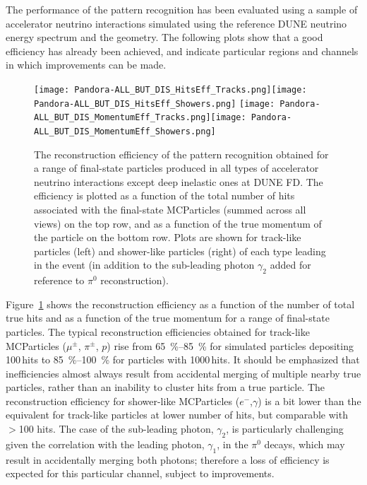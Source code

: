 The performance of the  pattern recognition has been evaluated using a sample of accelerator neutrino interactions simulated using the reference DUNE neutrino energy spectrum and the \nominalmodsize {} geometry. The following plots show that a good efficiency has already been achieved, and indicate particular regions and channels in which improvements can be made. 

\begin{figure}[!ht]
\centering
\texttt{[image: Pandora-ALL\_BUT\_DIS\_HitsEff\_Tracks.png]}\texttt{[image: Pandora-ALL\_BUT\_DIS\_HitsEff\_Showers.png]}
\texttt{[image: Pandora-ALL\_BUT\_DIS\_MomentumEff\_Tracks.png]}\texttt{[image: Pandora-ALL\_BUT\_DIS\_MomentumEff\_Showers.png]}

\caption[Reconstruction efficiency of  pattern recognition for a range of final-state particles at the ]{The reconstruction efficiency of the  pattern recognition obtained for a range of final-state particles produced in all types of accelerator neutrino interactions except deep inelastic ones at DUNE FD. The efficiency is plotted as a function of the total number of \twod hits associated with the final-state MCParticles (summed across all views) on the top row, and as a function of the true momentum of the particle on the bottom row. Plots are shown for track-like particles (left) and shower-like particles (right) of each type leading in the event (in addition to the sub-leading photon $\gamma_2$ added for reference to $\pi^0$ reconstruction).}
\label{pandora_particle_efficiency}
\end{figure}

Figure~\ref{pandora_particle_efficiency} shows the reconstruction efficiency as a function of the number of total true \twod hits and as a function of the true momentum for a range of final-state particles. The typical reconstruction efficiencies obtained for track-like MCParticles ($\mu^{\pm}$, $\pi^{\pm}$, $p$) rise from \SIrange{65}{85}{\%} for simulated particles depositing 100\,hits to \SIrange{85}{100}{\%} for particles with 1000\,hits. It should be emphasized that inefficiencies almost always result from accidental merging of multiple nearby true particles, rather than an inability to cluster hits from a true particle. The reconstruction efficiency for shower-like MCParticles ($e^{-}$,$\gamma$) is a bit lower than the equivalent for track-like particles at lower number of hits, but comparable with $>$100 hits. The case of the sub-leading photon, $\gamma_2$, is particularly challenging given the correlation with the leading photon, $\gamma_1$, in the $\pi^0$ decays, which may result in accidentally merging both photons; therefore a loss of efficiency is expected for this particular channel, subject to improvements. 

